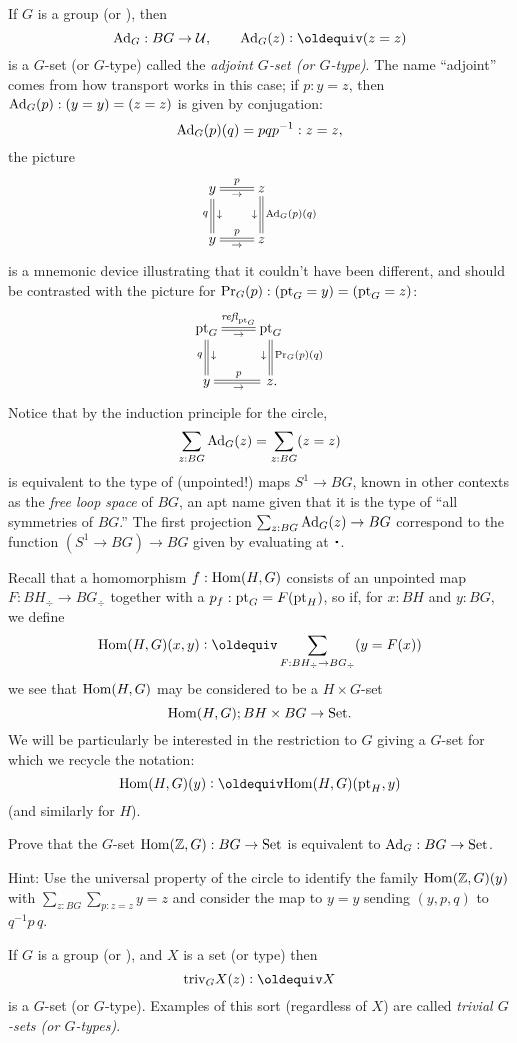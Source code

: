 \begin{example}\label{def:adjointrep}
  If $G$ is a group (or \inftygp), then
$$\Ad_G:BG\to\UU,\qquad\Ad_G(z)\defequi(z=z)$$ is a $G$-set (or $G$-type) called the \emph{adjoint $G$-set (or $G$-type)}.  The name ``adjoint'' comes from how transport works in this case; if $p:y=z$, then $\mathrm{Ad}_G(p):(y=y)=(z=z)$ is given by conjugation: 
$$\mathrm{Ad}_G(p)(q)=pqp^{-1}:z=z,$$ the picture
$$\xymatrix{y\ar@{=}[r]^p_\to\ar@{=}[d]_q^\downarrow&z\ar@{=}[d]^{\Ad_G(p)(q)}_\downarrow\\
y\ar@{=}[r]^p_\to&z}$$
is a mnemonic device illustrating that it couldn't have been different, and should be contrasted with the picture for $\mathrm{Pr}_{{G}} (p):({\mathord{\mathrm{pt}}}_G=y)=({\mathord{\mathrm{pt}}}_G=z)$:
$$\xymatrix{\pt_G\ar@{=}[r]^{\refl{\pt_G}}_\to\ar@{=}[d]_q^\downarrow&\pt_G\ar@{=}[d]^{\princ G(p)(q)}_\downarrow\\
y\ar@{=}[r]^p_\to&\,z.}$$  
Notice that by the induction principle for the circle,
$$\sum_{z:BG}\mathrm{Ad}_G(z)=\sum_{z:BG}(z=z)$$
is equivalent to the type of (unpointed!) maps $S^1\to BG$, known in other contexts as the \emph{free loop space} of $BG$, an apt name given that it is the type of ``all symmetries of $BG$.''  
The first projection $\sum_{z:BG}\mathrm{Ad}_G(z)\to BG$ correspond to the function $(S^1\to BG)\to BG$ given by evaluating at $\base$. 
\end{example}
\begin{example}
  \label{ex:HomHGasGset}
  Recall that a homomorphism $f:\mathrm{Hom}(H,G)$ consists of an unpointed map $F:BH_\div\to BG_\div$ together with a $p_f:{\mathord{\mathrm{pt}}}_G=F({\mathord{\mathrm{pt}}}_H)$, so if, for $x:BH$ and $y:BG$, we define
$$\Hom(H,G)(x,y)\defequi\sum_{F:BH_\div\to BG_\div}(y=F(x))$$
we see that $\mathrm{Hom}(H,G)$ may be considered to be a $H\times G$-set
$$\mathrm{Hom}(H,G);BH\times BG\to\mathord{\mathrm{Set}}.$$
We will be particularly be interested in the restriction to $G$ giving a $G$-set for which we recycle the notation: $$\Hom(H,G)(y)\defequi\Hom(H,G)(\pt_H,y)$$ (and similarly for $H$).
\end{example}
\begin{xca}
  \label{xca:HomZGvsAdG}
  Prove that the $G$-set $\mathrm{Hom}(\mathbb{Z},G):BG\to\mathord{\mathrm{Set}}$ is equivalent to $\mathrm{Ad}_G:BG\to\mathord{\mathrm{Set}}$.

Hint: Use the universal property of the circle to identify the family $\mathrm{Hom}(\mathbb{Z},G)(y)$ with $\sum_{z:BG}\sum_{p:z=z}y=z$ and consider the map to $y=y$ sending $(y,p,q)$ to $q^{-1}p\,q$.
\end{xca}


\begin{example}\label{def:trivGset}
  If $G$ is a group (or \inftygp), and $X$ is a set (or type) then
$$\mathrm{triv}_GX(z)\defequi X$$ is a $G$-set (or $G$-type).  Examples of this sort (regardless of $X$) are called \emph{trivial $G$-sets (or $G$-types)}.
\end{example}

